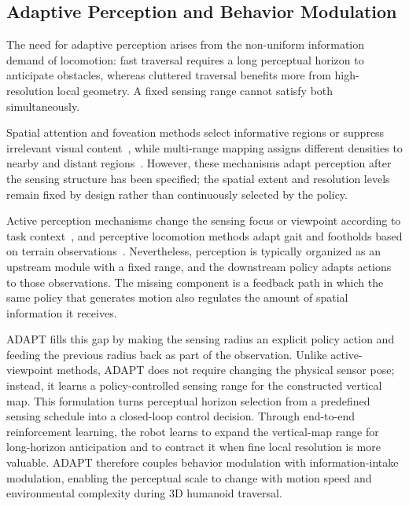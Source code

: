 \subsection{Adaptive Perception and Behavior Modulation}
The need for adaptive perception arises from the non-uniform information demand of locomotion: fast traversal requires a long perceptual horizon to anticipate obstacles, whereas cluttered traversal benefits more from high-resolution local geometry. A fixed sensing range cannot satisfy both simultaneously.


Spatial attention and foveation methods select informative regions or suppress irrelevant visual content~\cite{Wang_2025_AdaptiveVision,Zhang_2026_FocusNav}, while multi-range mapping assigns different densities to nearby and distant regions~\cite{Patel_2024_RoadRunnerMM}. However, these mechanisms adapt perception after the sensing structure has been specified; the spatial extent and resolution levels remain fixed by design rather than continuously selected by the policy.

Active perception mechanisms change the sensing focus or viewpoint according to task context~\cite{Liu_2026_ActiveVLA}, and perceptive locomotion methods adapt gait and footholds based on terrain observations~\cite{zhuang2024humanoid,long2025learning,wang2025beamdojo,ren2025vb}. Nevertheless, perception is typically organized as an upstream module with a fixed range, and the downstream policy adapts actions to those observations. The missing component is a feedback path in which the same policy that generates motion also regulates the amount of spatial information it receives.

ADAPT fills this gap by making the sensing radius an explicit policy action and feeding the previous radius back as part of the observation. Unlike active-viewpoint methods, ADAPT does not require changing the physical sensor pose; instead, it learns a policy-controlled sensing range for the constructed vertical map. This formulation turns perceptual horizon selection from a predefined sensing schedule into a closed-loop control decision. Through end-to-end reinforcement learning, the robot learns to expand the vertical-map range for long-horizon anticipation and to contract it when fine local resolution is more valuable. ADAPT therefore couples behavior modulation with information-intake modulation, enabling the perceptual scale to change with motion speed and environmental complexity during 3D humanoid traversal.
